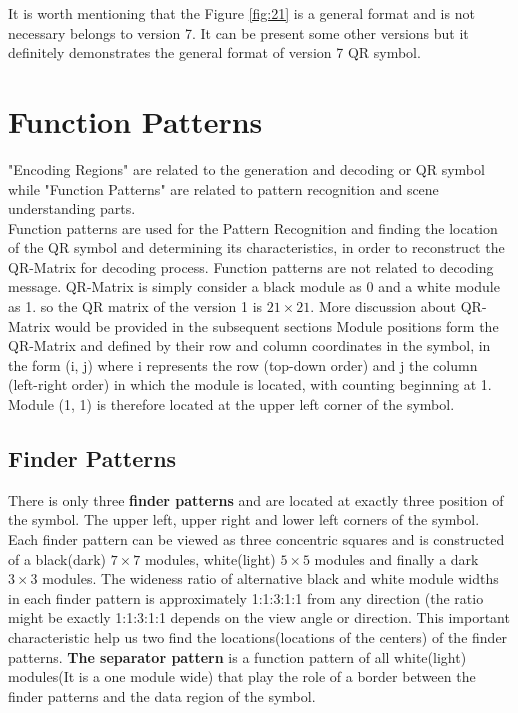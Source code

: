 It is worth mentioning that the Figure \ref{fig:21} is a general format and is not necessary belongs to version 7. It can be present some other versions but it definitely demonstrates the general format of version 7 QR symbol. 

\section{Function Patterns}
"Encoding Regions" are related to the generation and decoding or QR symbol while "Function Patterns" are related to pattern recognition and scene understanding parts.\\
Function patterns are used for the Pattern Recognition and finding the location of the QR symbol and determining its
characteristics, in order to reconstruct the QR-Matrix for decoding process. Function patterns are not related to decoding message. QR-Matrix is simply consider a black module as 0 and a white module as 1. so the QR matrix of the version 1 is $21 \times 21$. More discussion about QR-Matrix would be provided in the subsequent sections Module positions form the QR-Matrix and defined by their row and column coordinates in the symbol, in the form (i, j) where i represents the row (top-down order) and j the column (left-right order) in which the module is located, with counting beginning at 1. Module (1, 1) is therefore located at the upper left corner of the symbol\cite{Thonky}.

\subsection{Finder Patterns}

There is only three \textbf{finder patterns} and are located at exactly three position of the symbol. The upper left, upper right and lower left corners of the symbol. Each finder pattern can be viewed as three concentric squares and is constructed of a black(dark) $7 \times 7$ modules, white(light) $5 \times 5$ modules and finally a dark $3 \times 3$ modules. The wideness ratio of alternative black and white module widths in each finder pattern is approximately 1:1:3:1:1 from any direction (the ratio might be exactly 1:1:3:1:1 depends on the view angle or direction.
This important characteristic help us two find the locations(locations of the centers) of the finder patterns. \textbf{The separator pattern} is a function pattern of all white(light) modules(It is a one module wide) that play the role of a border between the finder patterns and the data region of
the symbol.

